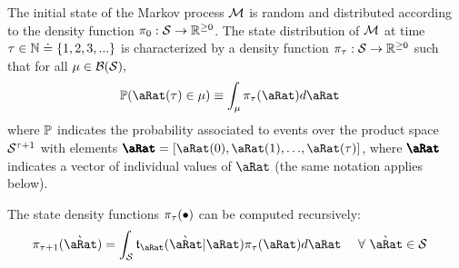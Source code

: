 \documentclass[../BufferStockTheory.tex]{subfiles}\usepackage{ApndxSteadyState}
\begin{document}
  The initial state of the Markov process $\Mrkv$ is random  and distributed according to the density function $\pDens_{0} : \DistSetSprtFull \rightarrow \reals^{\geq 0}$.  The state distribution of $\Mrkv$ at time $\tAbs \in \Nteger \doteq  \{1,2,3,...\}$ is characterized by a density function $\pDens_{\tAbs} : \mathcal{\DistSetSprtFull} \rightarrow \reals^{\geq 0}$ such that for all $\SetSub \in \Borel({\DistSetSprtFull}),$
  \begin{equation}\begin{gathered}\begin{aligned}
    \Pmeas(\point(\tAbs) \in \SetSub) & \equiv \int_{\SetSub} \pDens_{\tAbs}(\point)d\point
  \end{aligned}\end{gathered}\end{equation}
  where $\Pmeas$ indicates the probability associated to events over the product space $\DistSetSprtFull^{\tAbs+1}$ with elements $\vctr{\point}=[\point(0),\point(1),{\dots},\point(\tAbs)]$, where $\vctr{\point}$ indicates a vector of individual values of $\point$ (the same notation applies below).

  The state density functions $\pDens_{\tAbs}(\bullet)$ can be computed recursively:
  \begin{equation}\begin{gathered}\begin{aligned}
    \pDens_{\tAbs+1}(\Nxt{\point}) &= \int_{\DistSetSprtFull} \trns_{\point}(\Nxt{\point}|\point)\pDens_{\tAbs}(\point)d\point ~~~~ \forall~\Nxt{\point} \in \DistSetSprtFull \label{eq:stateDensity}
  \end{aligned}\end{gathered}\end{equation}
\end{document}
